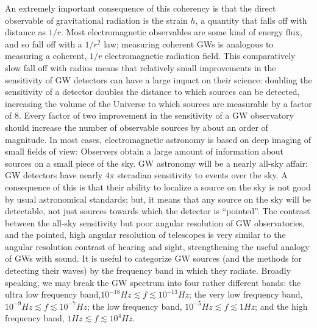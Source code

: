 \documentclass[binding=0.6cm, LaM]{sapthesis}
\begin{document}
An extremely important consequence of this coherency is that the direct observable of gravitational radiation is the strain $h$, a quantity that falls off with distance as $1/r$. 
Most electromagnetic observables are some kind of energy flux, and so fall off with a $1/r^2$ law; measuring coherent GWs is analogous to measuring a coherent, $1/r$ 
electromagnetic radiation field. This comparatively slow fall off with radius means that relatively small improvements in the sensitivity of GW detectors can have a large impact on their science: 
doubling the sensitivity of a detector doubles the distance to which sources can be detected, increasing the volume of the Universe to which sources are measurable by a factor of 8. 
Every factor of two improvement in the sensitivity of a GW observatory should increase the number of observable sources by about an order of magnitude. 
In most cases, electromagnetic astronomy is based on deep imaging of small fields of view: Observers obtain a large amount of information about sources on a small piece of the sky. 
GW astronomy will be a nearly all-sky affair: GW detectors have nearly $4\pi$ steradian sensitivity to events over the sky. A consequence of this is that their ability to localize a source on the sky
 is not good by usual astronomical standards; but, it means that any source on the sky will be detectable, not just sources towards which the detector is “pointed”. 
The contrast between the all-sky sensitivity but poor angular resolution of GW observatories, and the pointed, high angular resolution of telescopes is very similar to the angular resolution contrast
 of hearing and sight, strengthening the useful analogy of GWs with sound. 
It is useful to categorize GW sources (and the methods for detecting their waves) by the frequency band in which they radiate. 
Broadly speaking, we may break the GW spectrum into four rather different bands: the ultra low frequency band,$10^{-18}Hz \apprle f \apprle 10^{-13} Hz$; 
the very low frequency band, $10^{−9} Hz \apprle f \apprle 10^{−7} Hz$; the low frequency band, $10^{−5} Hz \apprle f \apprle 1Hz$; and the high frequency band, $1Hz \apprle f \apprle 10^4 Hz$.
\end{document}
